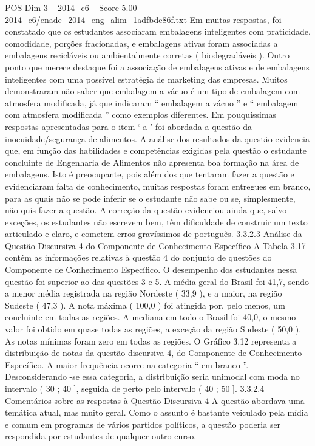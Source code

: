 \begin{textsample}{POS Dim 3 – 2014\_c6 – Score 5.00 – 2014\_c6/enade\_2014\_eng\_alim\_1adfbde86f.txt}
Em muitas respostas, foi constatado que os estudantes associaram embalagens inteligentes com praticidade, comodidade, porções fracionadas, e embalagens ativas foram associadas a embalagens recicláveis ou ambientalmente corretas ( biodegradáveis ).
Outro ponto que merece destaque foi a associação de embalagens ativas e de embalagens inteligentes com uma possível estratégia de marketing das empresas.
Muitos demonstraram não saber que embalagem a vácuo é um tipo de embalagem com atmosfera modificada, já que indicaram “ embalagem a vácuo ” e “ embalagem com atmosfera modificada ” como exemplos diferentes.
Em pouquíssimas respostas apresentadas para o item ‘ a ’ foi abordada a questão da inocuidade/segurança de alimentos.
A análise dos resultados da questão evidencia que, em função das habilidades e competências exigidas pela questão o estudante concluinte de Engenharia de Alimentos não apresenta boa formação na área de embalagens.
Isto é preocupante, pois além dos que tentaram fazer a questão e evidenciaram falta de conhecimento, muitas respostas foram entregues em branco, para as quais não se pode inferir se o estudante não sabe ou se, simplesmente, não quis fazer a questão.
A correção da questão evidenciou ainda que, salvo exceções, os estudantes não escrevem bem, têm dificuldade de construir um texto articulado e claro, e cometem erros gravíssimos de português. 3.3.2.3 Análise da Questão Discursiva 4 do Componente de Conhecimento Específico A Tabela 3.17 contém as informações relativas à questão 4 do conjunto de questões do Componente de Conhecimento Específico.
O desempenho dos estudantes nessa questão foi superior ao das questões 3 e 5.
A média geral do Brasil foi 41,7, sendo a menor média registrada na região Nordeste ( 33,9 ), e a maior, na região Sudeste ( 47,3 ).
A nota máxima ( 100,0 ) foi atingida por, pelo menos, um concluinte em todas as regiões.
A mediana em todo o Brasil foi 40,0, o mesmo valor foi obtido em quase todas as regiões, a exceção da região Sudeste ( 50,0 ).
As notas mínimas foram zero em todas as regiões.
O Gráfico 3.12 representa a distribuição de notas da questão discursiva 4, do Componente de Conhecimento Específico.
A maior frequência ocorre na categoria “ em branco ”.
Desconsiderando -se essa categoria, a distribuição seria unimodal com moda no intervalo ( 30 ; 40 ], seguida de perto pelo intervalo ( 40 ; 50 ]. 3.3.2.4 Comentários sobre as respostas à Questão Discursiva 4 A questão abordava uma temática atual, mas muito geral.
Como o assunto é bastante veiculado pela mídia e comum em programas de vários partidos políticos, a questão poderia ser respondida por estudantes de qualquer outro curso.

\end{textsample}
